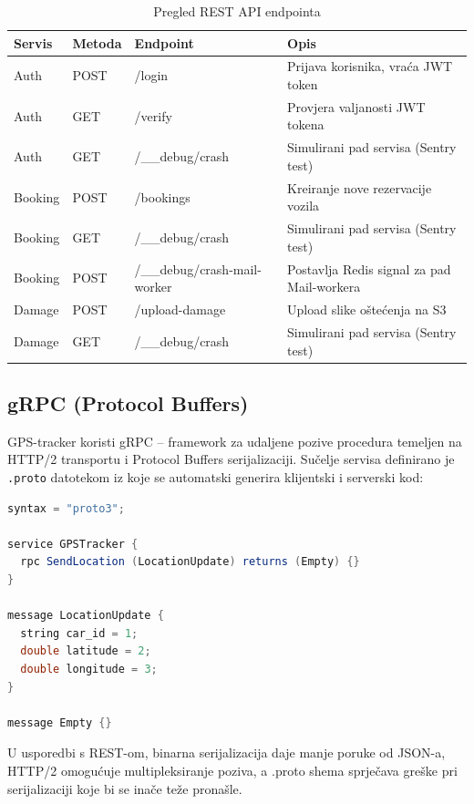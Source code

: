 \documentclass[12pt,a4paper]{article}
\begin{document}
\begin{table}[H]
\centering
\caption{Pregled REST API endpointa}
\label{tab:endpoints}
\begin{tabularx}{\textwidth}{l l l X}
\toprule
\textbf{Servis} & \textbf{Metoda} & \textbf{Endpoint} & \textbf{Opis} \\
\midrule
Auth    & POST & /login                     & Prijava korisnika, vraća JWT token \\
Auth    & GET  & /verify                    & Provjera valjanosti JWT tokena \\
Auth    & GET  & /\_\_debug/crash           & Simulirani pad servisa (Sentry test) \\
Booking & POST & /bookings                  & Kreiranje nove rezervacije vozila \\
Booking & GET  & /\_\_debug/crash           & Simulirani pad servisa (Sentry test) \\
Booking & POST & /\_\_debug/crash-mail-worker & Postavlja Redis signal za pad Mail-workera \\
Damage  & POST & /upload-damage             & Upload slike oštećenja na S3 \\
Damage  & GET  & /\_\_debug/crash           & Simulirani pad servisa (Sentry test) \\
\bottomrule
\end{tabularx}
\end{table}

\subsection{gRPC (Protocol Buffers)}

GPS-tracker koristi gRPC -- framework za udaljene pozive procedura temeljen na HTTP/2 transportu i Protocol Buffers serijalizaciji. Sučelje servisa definirano je \texttt{.proto} datotekom iz koje se automatski generira klijentski i serverski kod:

\begin{lstlisting}[language=Java,caption={Definicija gRPC sučelja (gps.proto)}]
syntax = "proto3";

service GPSTracker {
  rpc SendLocation (LocationUpdate) returns (Empty) {}
}

message LocationUpdate {
  string car_id = 1;
  double latitude = 2;
  double longitude = 3;
}

message Empty {}
\end{lstlisting}

U usporedbi s REST-om, binarna serijalizacija daje manje poruke od JSON-a, HTTP/2 omogućuje multipleksiranje poziva, a .proto shema sprječava greške pri serijalizaciji koje bi se inače teže pronašle.
\end{document}
